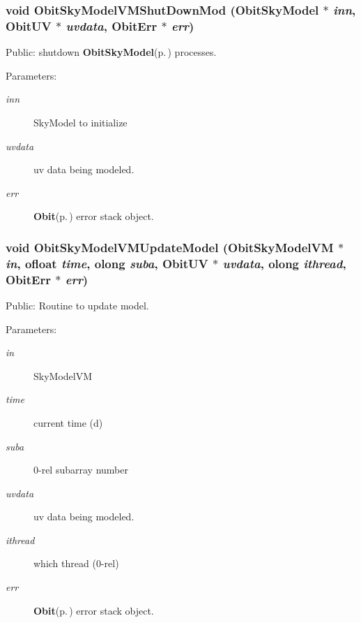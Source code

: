 \subsubsection{\setlength{\rightskip}{0pt plus 5cm}void Obit\-Sky\-Model\-VMShut\-Down\-Mod ({\bf Obit\-Sky\-Model} $\ast$ {\em inn}, {\bf Obit\-UV} $\ast$ {\em uvdata}, {\bf Obit\-Err} $\ast$ {\em err})}\label{ObitSkyModelVM_8h_a9}


Public: shutdown {\bf Obit\-Sky\-Model}{\rm (p.\,\pageref{structObitSkyModel})} processes. 

\begin{Desc}
\item[Parameters:]
\begin{description}
\item[{\em inn}]Sky\-Model to initialize \item[{\em uvdata}]uv data being modeled. \item[{\em err}]{\bf Obit}{\rm (p.\,\pageref{structObit})} error stack object. \end{description}
\end{Desc}
\subsubsection{\setlength{\rightskip}{0pt plus 5cm}void Obit\-Sky\-Model\-VMUpdate\-Model ({\bf Obit\-Sky\-Model\-VM} $\ast$ {\em in}, {\bf ofloat} {\em time}, {\bf olong} {\em suba}, {\bf Obit\-UV} $\ast$ {\em uvdata}, {\bf olong} {\em ithread}, {\bf Obit\-Err} $\ast$ {\em err})}\label{ObitSkyModelVM_8h_a13}


Public: Routine to update model. 

\begin{Desc}
\item[Parameters:]
\begin{description}
\item[{\em in}]Sky\-Model\-VM \item[{\em time}]current time (d) \item[{\em suba}]0-rel subarray number \item[{\em uvdata}]uv data being modeled. \item[{\em ithread}]which thread (0-rel) \item[{\em err}]{\bf Obit}{\rm (p.\,\pageref{structObit})} error stack object. \end{description}
\end{Desc}
